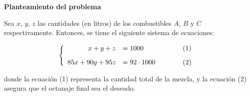 \documentclass[11pt]{article}
\begin{document}
\begin{enumerate}[\hspace{-7mm} 1) ]
\textbf{Planteamiento del problema}

Sea $x$, $y$, $z$ las cantidades (en litros) de los combustibles $A$, $B$ y $C$ respectivamente. Entonces, se tiene el siguiente sistema de ecuaciones:


$$
\left\{
\begin{array}{rl@{\qquad\qquad} r}
    x  + y + z &= 1000 & (1)
    \\[3mm]
    85x + 90y + 95z &= 92 \cdot 1000 & (2) 
\end{array} 
\right.$$

donde la ecuación (1) representa la cantidad total de la mezcla, y la ecuación (2) asegura que el octanaje final sea el deseado.

\end{enumerate}
\end{document}
